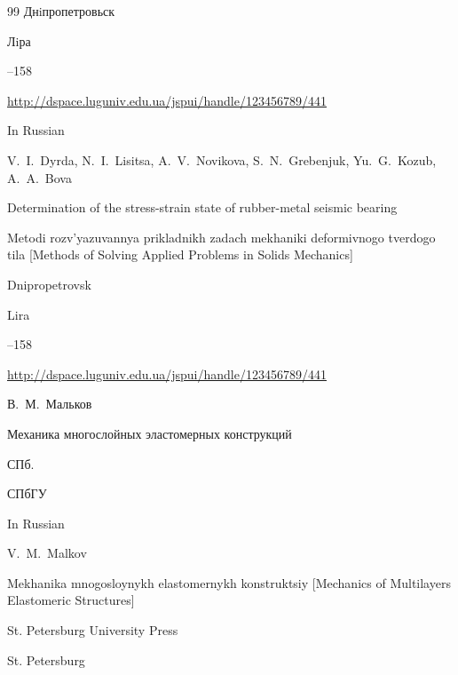 \begin{thebibliography}{99}
\publaddr Днiпропетровьск

\publ Лiра



--158

\elink \url{http://dspace.luguniv.edu.ua/jspui/handle/123456789/441}

\misctransl

\lang In Russian

\by V.~I.~Dyrda, N.~I.~Lisitsa, A.~V.~Novikova, S.~N.~Grebenjuk, Yu.~G.~Kozub, A.~A.~Bova

\paper  Determination of the stress-strain state of rubber-metal seismic bearing

\inbook Metodi rozv'yazuvannya prikladnikh zadach mekhaniki deformivnogo tverdogo tila \rm [Methods of Solving Applied Problems in Solids Mechanics]

\publaddr Dnipropetrovsk

\publ Lira



--158

\elink \url{http://dspace.luguniv.edu.ua/jspui/handle/123456789/441}










\by В.~М.~Мальков

\book Механика многослойных эластомерных конструкций

\publaddr СПб.

\publ \mbox{СПбГУ}



\misctransl

\lang In Russian

\by V.~M.~Malkov

\book Mekhanika mnogosloynykh elastomernykh konstruktsiy \rm [Mechanics of Multilayers Elastomeric Structures]

\publ St. Petersburg University Press

\publaddr St. Petersburg








\end{thebibliography}
